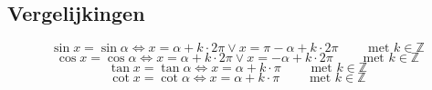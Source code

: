 \subsection{Vergelijkingen}
 \label{sec:goniovgl}
  \[
	   \sin x = \sin \alpha
	   \Leftrightarrow 
	   x = \alpha + k \cdot 2\pi \vee x = \pi - \alpha + k \cdot 2\pi  
	   \qquad
	   \textrm{ met } k \in \mathbb{Z}
  \]
  \[
	   \cos x = \cos \alpha 
	   \Leftrightarrow
	   x = \alpha + k \cdot 2\pi \vee x = - \alpha + k \cdot 2\pi
	   \qquad
	   \textrm{ met } k \in \mathbb{Z}
  \]
  \[
	   \tan x = \tan \alpha 
	   \Leftrightarrow
	   x = \alpha + k \cdot \pi 
	   \qquad
	   \textrm{ met } k \in \mathbb{Z}
  \]
  \[
	   \cot x = \cot \alpha 
	   \Leftrightarrow
	   x = \alpha + k \cdot \pi 
	   \qquad
	   \textrm{ met } k \in \mathbb{Z}
  \]
